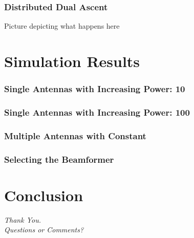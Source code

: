 \documentclass[10pt,tgadventor, onlymath]{beamer}
\begin{document}
\begin{frame}
\frametitle{Distributed Dual Ascent}
Picture depicting what happens here
\end{frame}

\section{Simulation Results}
\begin{frame}
\frametitle{Single Antennas with Increasing Power: 10}

\end{frame}
\begin{frame}
\frametitle{Single Antennas with Increasing Power: 100}

\end{frame}


\begin{frame}
\frametitle{Multiple Antennas with Constant}

\end{frame}

\begin{frame}
\frametitle{Selecting the Beamformer}

\end{frame}

\section{Conclusion}

\begin{frame}
  \centering \Large
  \emph{Thank You.}
  \\
	\bigskip
    \centering \Large
  \emph{Questions or Comments?}

\end{frame}
\end{document}
